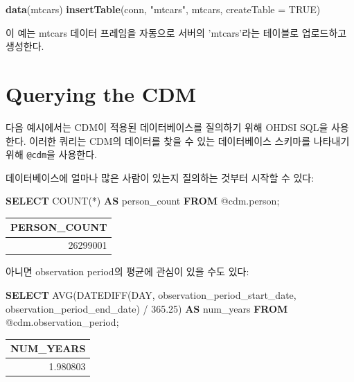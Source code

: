 \documentclass[11pt]{book}
\newenvironment{Shaded}{\begin{snugshade}}{\end{snugshade}}
\newcommand{\KeywordTok}[1]{\textcolor[rgb]{0.13,0.29,0.53}{\textbf{#1}}}
\newcommand{\DataTypeTok}[1]{\textcolor[rgb]{0.13,0.29,0.53}{#1}}
\newcommand{\FloatTok}[1]{\textcolor[rgb]{0.00,0.00,0.81}{#1}}
\newcommand{\StringTok}[1]{\textcolor[rgb]{0.31,0.60,0.02}{#1}}
\newcommand{\OtherTok}[1]{\textcolor[rgb]{0.56,0.35,0.01}{#1}}
\newcommand{\FunctionTok}[1]{\textcolor[rgb]{0.00,0.00,0.00}{#1}}
\newcommand{\NormalTok}[1]{#1}
\theoremstyle{definition}
\theoremstyle{definition}
\theoremstyle{definition}
\theoremstyle{remark}
\begin{document}
\begin{Shaded}
\begin{Highlighting}[]
\KeywordTok{data}\NormalTok{(mtcars)}
\KeywordTok{insertTable}\NormalTok{(conn, }\StringTok{"mtcars"}\NormalTok{, mtcars, }\DataTypeTok{createTable =} \OtherTok{TRUE}\NormalTok{)}
\end{Highlighting}
\end{Shaded}

이 예는 mtcars 데이터 프레임을 자동으로 서버의 'mtcars'라는 테이블로
업로드하고 생성한다.

\section{Querying the CDM}\label{QueryTheCdm}

다음 예시에서는 CDM이 적용된 데이터베이스를 질의하기 위해 OHDSI SQL을
사용한다. 이러한 쿼리는 CDM의 데이터를 찾을 수 있는 데이터베이스
스키마를 나타내기 위해 \texttt{@cdm}을 사용한다.

데이터베이스에 얼마나 많은 사람이 있는지 질의하는 것부터 시작할 수 있다:

\begin{Shaded}
\begin{Highlighting}[]
\KeywordTok{SELECT} \FunctionTok{COUNT}\NormalTok{(*) }\KeywordTok{AS}\NormalTok{ person_count }\KeywordTok{FROM}\NormalTok{ @cdm.person;}
\end{Highlighting}
\end{Shaded}

\begin{longtable}[]{@{}r@{}}
\toprule
PERSON\_COUNT\tabularnewline
\midrule
\endhead
26299001\tabularnewline
\bottomrule
\end{longtable}

아니면 observation period의 평균에 관심이 있을 수도 있다:

\begin{Shaded}
\begin{Highlighting}[]
\KeywordTok{SELECT} \FunctionTok{AVG}\NormalTok{(DATEDIFF(}\DataTypeTok{DAY}\NormalTok{, }
\NormalTok{                    observation_period_start_date, }
\NormalTok{                    observation_period_end_date) / }\FloatTok{365.25}\NormalTok{) }\KeywordTok{AS}\NormalTok{ num_years}
\KeywordTok{FROM}\NormalTok{ @cdm.observation_period;}
\end{Highlighting}
\end{Shaded}

\begin{longtable}[]{@{}r@{}}
\toprule
NUM\_YEARS\tabularnewline
\midrule
\endhead
1.980803\tabularnewline
\bottomrule
\end{longtable}
\end{document}
